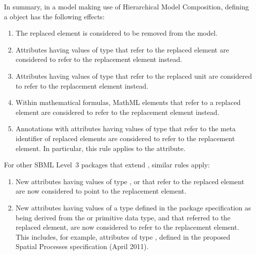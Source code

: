 In summary, in a \sbmlthreecore model making use of Hierarchical Model Composition, defining a \ReplacedElement object has the following effects:

\begin{enumerate}


\item The replaced element is considered to be removed from the model.

\item Attributes having values of type  that refer to the replaced element are considered to refer to the replacement element instead.

\item Attributes having values of type  that refer to the replaced unit are considered to refer to the replacement element instead.

\item Within mathematical formulas, MathML  elements that refer to a replaced element are considered to refer to the replacement element instead.

\item Annotations with attributes having values of type  that refer to the meta identifier of replaced elements are considered to refer to the replacement element. In particular, this rule applies to the  attribute.

\end{enumerate}

For other SBML Level~3 packages that extend \sbmlthreecore, similar rules apply:

\begin{enumerate}

\item New attributes having values of type ,  or  that refer to the replaced element are now considered to point to the replacement element.

\item New attributes having values of a type defined in the package specification as being derived from the  or  primitive data type, and that referred to the replaced element, are now considered to refer to the replacement element. This includes, for example, attributes of type , defined in the proposed Spatial Processes specification (April 2011).

\end{enumerate}

